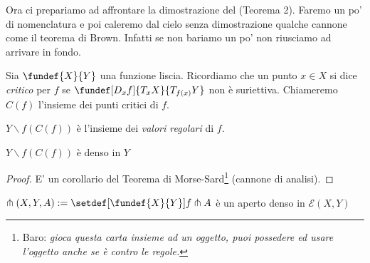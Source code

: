 Ora ci prepariamo ad affrontare la dimostrazione del (Teorema 2). Faremo un po' di nomenclatura e poi caleremo dal cielo senza dimostrazione qualche cannone come il teorema di Brown. Infatti se non bariamo un po' non riusciamo ad arrivare in fondo.

\begin{defn} Sia $\fundef{X}{Y}$ una funzione liscia. Ricordiamo che un punto $x \in X$ si dice \emph{critico} per $f$ se $\fundef[D_xf]{T_xX}{T_{f(x)}Y}$ non è suriettiva. Chiameremo $C(f)$ l'insieme dei punti critici di $f$.
\end{defn}

\begin{oss}
$Y \backslash f(C(f))$ è l'insieme dei \emph{valori regolari} di $f$.
\end{oss}

\begin{teo}[Brown]
$Y \backslash f(C(f))$ è denso in $Y$
\end{teo}

\begin{proof}
E' un corollario del Teorema di Morse-Sard\footnote{Baro: \emph{gioca questa carta insieme ad un oggetto, puoi possedere ed usare l'oggetto anche se è contro le regole.}} (cannone di analisi).
\end{proof}

\begin{teo}
$\pitchfork(X,Y,A) := \setdef[\fundef{X}{Y}]{f \pitchfork A}$ è un aperto denso in $\mathcal{E}(X,Y)$
\end{teo}

